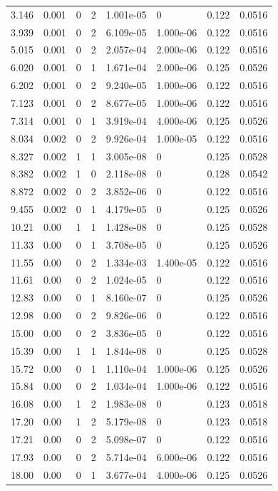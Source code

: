 \documentclass[preview]{standalone}
\begin{document}
{{\begin{tabular}{L{1.2cm}C{1.2cm} C{0.3cm}C{0.5cm} C{1.4cm}C{1.4cm} C{1.4cm}C{1.4cm}}
  3.146  &  0.001  & 0     &  2 &  1.001e-05  & 0  & 0.122 &  0.0516   \\ 
  3.939  &  0.001  & 0     &  2 &  6.109e-05  & 1.000e-06  & 0.122 &  0.0516   \\ 
  5.015  &  0.001  & 0     &  2 &  2.057e-04  & 2.000e-06  & 0.122 &  0.0516   \\ 
  6.020  &  0.001  & 0     &  1 &  1.671e-04  & 2.000e-06  & 0.125 &  0.0526   \\ 
  6.202  &  0.001  & 0     &  2 &  9.240e-05  & 1.000e-06  & 0.122 &  0.0516   \\ 
  7.123  &  0.001  & 0     &  2 &  8.677e-05  & 1.000e-06  & 0.122 &  0.0516   \\ 
  7.314  &  0.001  & 0     &  1 &  3.919e-04  & 4.000e-06  & 0.125 &  0.0526   \\ 
  8.034  &  0.002  & 0     &  2 &  9.926e-04  & 1.000e-05  & 0.122 &  0.0516   \\ 
  8.327  &  0.002  & 1     &  1 &  3.005e-08  & 0  & 0.125 &  0.0528   \\ 
  8.382  &  0.002  & 1     &  0 &  2.118e-08  & 0  & 0.128 &  0.0542   \\ 
  8.872  &  0.002  & 0     &  2 &  3.852e-06  & 0  & 0.122 &  0.0516   \\ 
  9.455  &  0.002  & 0     &  1 &  4.179e-05  & 0  & 0.125 &  0.0526   \\ 
  10.21  &  0.00  & 1     &  1 &  1.428e-08  & 0  & 0.125 &  0.0528   \\ 
  11.33  &  0.00  & 0     &  1 &  3.708e-05  & 0  & 0.125 &  0.0526   \\ 
  11.55  &  0.00  & 0     &  2 &  1.334e-03  & 1.400e-05  & 0.122 &  0.0516   \\ 
  11.61  &  0.00  & 0     &  2 &  1.024e-05  & 0  & 0.122 &  0.0516   \\ 
  12.83  &  0.00  & 0     &  1 &  8.160e-07  & 0  & 0.125 &  0.0526   \\ 
  12.98  &  0.00  & 0     &  2 &  9.826e-06  & 0  & 0.122 &  0.0516   \\ 
  15.00  &  0.00  & 0     &  2 &  3.836e-05  & 0  & 0.122 &  0.0516   \\ 
  15.39  &  0.00  & 1     &  1 &  1.844e-08  & 0  & 0.125 &  0.0528   \\ 
  15.72  &  0.00  & 0     &  1 &  1.110e-04  & 1.000e-06  & 0.125 &  0.0526   \\ 
  15.84  &  0.00  & 0     &  2 &  1.034e-04  & 1.000e-06  & 0.122 &  0.0516   \\ 
  16.08  &  0.00  & 1     &  2 &  1.983e-08  & 0  & 0.123 &  0.0518   \\ 
  17.20  &  0.00  & 1     &  2 &  5.179e-08  & 0  & 0.123 &  0.0518   \\ 
  17.21  &  0.00  & 0     &  2 &  5.098e-07  & 0  & 0.122 &  0.0516   \\ 
  17.93  &  0.00  & 0     &  2 &  5.714e-04  & 6.000e-06  & 0.122 &  0.0516   \\ 
  18.00  &  0.00  & 0     &  1 &  3.677e-04  & 4.000e-06  & 0.125 &  0.0526   \\ 
\hline 
\end{tabular} 

}}
\end{document}
